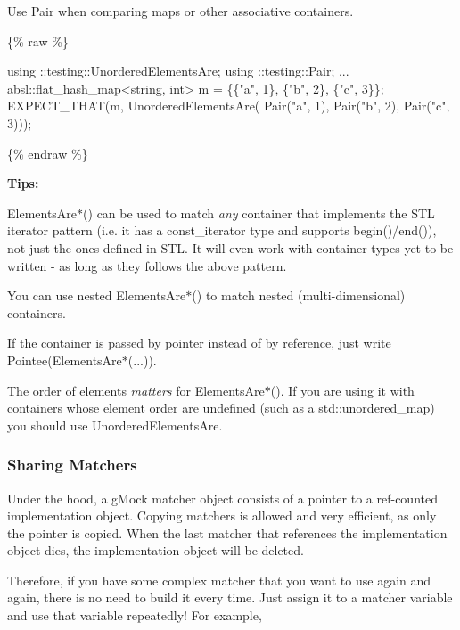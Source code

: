 Use {\ttfamily Pair} when comparing maps or other associative containers.

\{\% raw \%\}


\begin{DoxyCode}
using ::testing::UnorderedElementsAre;
using ::testing::Pair;
...
  absl::flat\_hash\_map<string, int> m = \{\{\textcolor{stringliteral}{"a"}, 1\}, \{\textcolor{stringliteral}{"b"}, 2\}, \{\textcolor{stringliteral}{"c"}, 3\}\};
  EXPECT\_THAT(m, UnorderedElementsAre(
      Pair(\textcolor{stringliteral}{"a"}, 1), Pair(\textcolor{stringliteral}{"b"}, 2), Pair(\textcolor{stringliteral}{"c"}, 3)));
\end{DoxyCode}


\{\% endraw \%\}

{\bfseries Tips\+:}


\begin{DoxyItemize}
\item {\ttfamily Elements\+Are$\ast$()} can be used to match {\itshape any} container that implements the S\+TL iterator pattern (i.\+e. it has a {\ttfamily const\+\_\+iterator} type and supports {\ttfamily begin()/end()}), not just the ones defined in S\+TL. It will even work with container types yet to be written -\/ as long as they follows the above pattern.
\item You can use nested {\ttfamily Elements\+Are$\ast$()} to match nested (multi-\/dimensional) containers.
\item If the container is passed by pointer instead of by reference, just write {\ttfamily Pointee(Elements\+Are$\ast$(...))}.
\item The order of elements {\itshape matters} for {\ttfamily Elements\+Are$\ast$()}. If you are using it with containers whose element order are undefined (such as a {\ttfamily std\+::unordered\+\_\+map}) you should use {\ttfamily Unordered\+Elements\+Are}.
\end{DoxyItemize}

\subsubsection*{Sharing Matchers}

Under the hood, a g\+Mock matcher object consists of a pointer to a ref-\/counted implementation object. Copying matchers is allowed and very efficient, as only the pointer is copied. When the last matcher that references the implementation object dies, the implementation object will be deleted.

Therefore, if you have some complex matcher that you want to use again and again, there is no need to build it every time. Just assign it to a matcher variable and use that variable repeatedly! For example,


